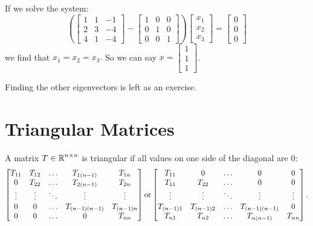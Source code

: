 If we solve the system: \[\left(\begin{bmatrix}1&1&-1\\2&3&-4\\4&1&-4\end{bmatrix}-\begin{bmatrix}1&0&0\\0&1&0\\0&0&1\end{bmatrix}\right)\begin{bmatrix}x_1\\x_2\\x_3\end{bmatrix}=\begin{bmatrix}0\\0\\0\end{bmatrix}\] we find that $x_1=x_2=x_3.$ So we can say $x=\begin{bmatrix}1\\1\\1\end{bmatrix}$.

Finding the other eigenvectors is left as an exercise. 

\section{Triangular Matrices}
A matrix $T\in\operatorname{\mathbb{R}}^{n\times n}$ is triangular if all values on one side of the diagonal are 0:
\[
\begin{bmatrix}
T_{11} & T_{12} & \hdots & T_{1(n-1)} & T_{1n}\\
0 & T_{22} & \hdots & T_{2(n-1)} & T_{2n}\\
\vdots & \vdots & \ddots & \vdots & \vdots\\
0 & 0 & \hdots & T_{(n-1)(n-1)} & T_{(n-1)n}\\
0 & 0 & \hdots & 0 & T_{nn}\\
\end{bmatrix}
\textnormal{or} 
\begin{bmatrix}
T_{11} & 0 & \hdots & 0 & 0 \\
T_{11} & T_{22} & \hdots & 0 & 0\\
\vdots & \vdots & \ddots & \vdots & \vdots\\
T_{(n-1)1} & T_{(n-1)2} & \hdots & T_{(n-1)(n-1)} &0\\
T_{n1} & T_{n2} & \hdots & T_{n(n-1)} & T_{nn}\\
\end{bmatrix}.
\]

